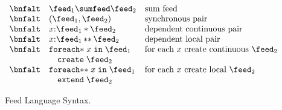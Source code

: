 \begin{figure}[t]
\[\begin{array}{lll}
 \bnfalt & \feed_1 \sumfeed \feed_2 & \mbox{sum feed} \\
 \bnfalt & (\feed_1, \feed_2) & \mbox{synchronous pair} \\
 \bnfalt & x{:}\feed_1 * \feed_2 & \mbox{dependent continuous pair} \\
 \bnfalt & x{:}\feed_1\, {*}{*} \, \feed_2 & \mbox{dependent local pair} \\
 \bnfalt &     \mathtt{foreach{*}}\; x \; 
    \mathtt{in}\; \feed_1 & \mbox{for each $x$ create continuous $\feed_2$} \\
 &   \quad \mathtt{create}\; \feed_2 \\
 \bnfalt &     \mathtt{foreach{*}{*}}\; x \; 
    \mathtt{in}\; \feed_1 & \mbox{for each $x$ create local $\feed_2$}\\
 &   \quad \mathtt{extend}\; \feed_2 \\
\end{array}
\]
\caption{Feed Language Syntax.}
\label{fig:syntax}
\end{figure}


